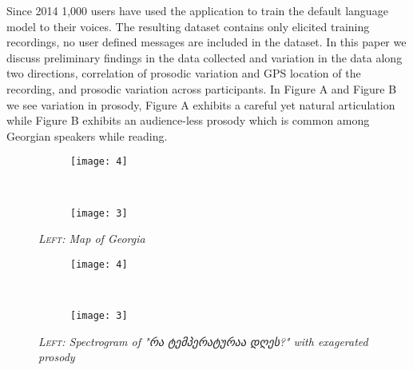 \documentclass[12pt]{amsart}
\begin{document}
Since 2014 1,000 users have used the application to train the default language
model to their voices. The resulting dataset contains only elicited training
recordings, no user defined messages are included in the dataset. In this paper
we discuss preliminary findings in the data collected and variation in the data
along two directions, correlation of prosodic variation and GPS location of the
recording, and prosodic variation across participants. In Figure A and Figure B
we see variation in prosody, Figure A exhibits a careful yet natural articulation
while Figure B exhibits an audience-less prosody which is common among
Georgian speakers while reading.


\newpage
\begin{figure}
    \centering
    \begin{subfigure}[b]{0.55\textwidth}
        \texttt{[image: 4]}
        \label{fig:mono}
    \end{subfigure}
    ~ %
    \begin{subfigure}[b]{0.45\textwidth}
        \texttt{[image: 3]}
        \label{fig:bil}
    \end{subfigure}
    \caption{\footnotesize{\textit{\textsc{Left:} Map of Georgia}}}\label{fig:map}
\end{figure}



\newpage
\begin{figure}
    \centering
    \begin{subfigure}[b]{0.55\textwidth}
        \texttt{[image: 4]}
        \label{fig:mono}
    \end{subfigure}
    ~ %
    \begin{subfigure}[b]{0.45\textwidth}
        \texttt{[image: 3]}
        \label{fig:bil}
    \end{subfigure}
    \caption{\footnotesize{\textit{\textsc{Left:} Spectrogram of "რა ტემპერატურაა დღეს?" with exagerated prosody}}}\label{fig:prosody1}
\end{figure}
\end{document}
